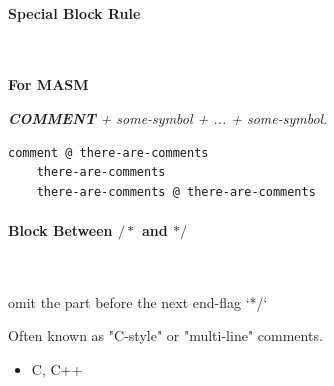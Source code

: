 \paragraph{Special Block Rule} \



\textbf{For MASM}



\textbf{\textit{COMMENT}}\textit{ + some-symbol + ... + some-symbol}.

\begin{lstlisting}[language={[x86masm]Assembler}]
	comment @ there-are-comments
	there-are-comments
	there-are-comments @ there-are-comments
\end{lstlisting}



\paragraph{Block Between $/*$ and $*/$} \



omit the part before the next end-flag `*/`

Often known as "C-style" or "multi-line" comments.

\begin{itemize}

\item C, C++
\end{itemize}

